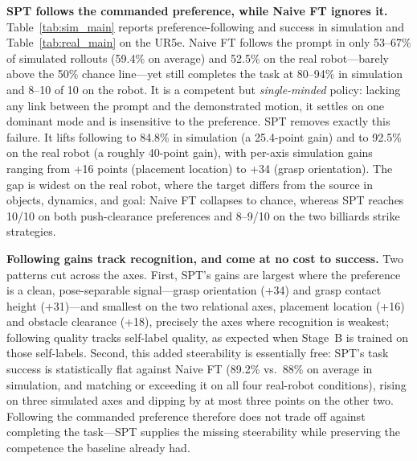 \documentclass{article}
\begin{document}
\textbf{SPT follows the commanded preference, while Naive FT ignores it.}
Table~\ref{tab:sim_main} reports preference-following and success in simulation
and Table~\ref{tab:real_main} on the UR5e. Naive FT follows the prompt in only
53--67\% of simulated rollouts (59.4\% on average) and 52.5\% on the real
robot---barely above the 50\% chance line---yet still completes the task at
80--94\% in simulation and 8--10 of 10 on the robot. It is a competent but
\emph{single-minded} policy: lacking any link between the prompt and the
demonstrated motion, it settles on one dominant mode and is insensitive to the
preference. SPT removes exactly this failure. It lifts following to 84.8\% in
simulation (a 25.4-point gain) and to 92.5\% on the real robot (a roughly
40-point gain), with per-axis simulation gains ranging from +16 points (placement
location) to +34 (grasp orientation). The gap is widest on the real robot, where
the target differs from the source in objects, dynamics, and goal: Naive FT
collapses to chance, whereas SPT reaches 10/10 on both push-clearance preferences
and 8--9/10 on the two billiards strike strategies.

\textbf{Following gains track recognition, and come at no cost to success.}
Two patterns cut across the axes. First, SPT's gains are largest where the
preference is a clean, pose-separable signal---grasp orientation (+34) and grasp
contact height (+31)---and smallest on the two relational axes, placement location
(+16) and obstacle clearance (+18), precisely the axes where recognition is
weakest; following quality tracks self-label quality, as expected when Stage~B is
trained on those self-labels. Second, this added steerability is essentially free:
SPT's task success is statistically flat against Naive FT (89.2\% vs.\ 88\% on
average in simulation, and matching or exceeding it on all four real-robot
conditions), rising on three simulated axes and dipping by at most three points on
the other two. Following the commanded preference therefore does not trade off
against completing the task---SPT supplies the missing steerability while
preserving the competence the baseline already had. 
\end{document}
